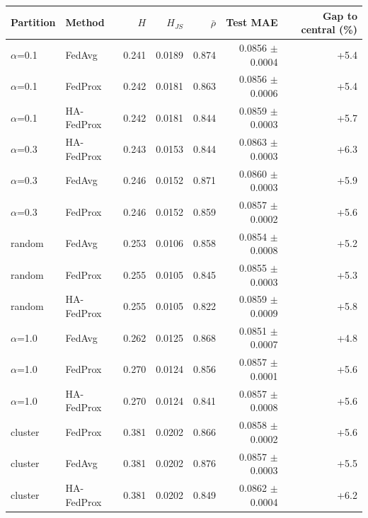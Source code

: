 \begin{tabular}{llrrrrr}
\toprule
Partition & Method & $H$ & $H_{JS}$ & $\bar\rho$ & Test MAE & Gap to central (\%) \\
\midrule
$\alpha$=0.1 & FedAvg & 0.241 & 0.0189 & 0.874 & 0.0856 $\pm$ 0.0004 & +5.4 \\
$\alpha$=0.1 & FedProx & 0.242 & 0.0181 & 0.863 & 0.0856 $\pm$ 0.0006 & +5.4 \\
$\alpha$=0.1 & HA-FedProx & 0.242 & 0.0181 & 0.844 & 0.0859 $\pm$ 0.0003 & +5.7 \\
$\alpha$=0.3 & HA-FedProx & 0.243 & 0.0153 & 0.844 & 0.0863 $\pm$ 0.0003 & +6.3 \\
$\alpha$=0.3 & FedAvg & 0.246 & 0.0152 & 0.871 & 0.0860 $\pm$ 0.0003 & +5.9 \\
$\alpha$=0.3 & FedProx & 0.246 & 0.0152 & 0.859 & 0.0857 $\pm$ 0.0002 & +5.6 \\
random & FedAvg & 0.253 & 0.0106 & 0.858 & 0.0854 $\pm$ 0.0008 & +5.2 \\
random & FedProx & 0.255 & 0.0105 & 0.845 & 0.0855 $\pm$ 0.0003 & +5.3 \\
random & HA-FedProx & 0.255 & 0.0105 & 0.822 & 0.0859 $\pm$ 0.0009 & +5.8 \\
$\alpha$=1.0 & FedAvg & 0.262 & 0.0125 & 0.868 & 0.0851 $\pm$ 0.0007 & +4.8 \\
$\alpha$=1.0 & FedProx & 0.270 & 0.0124 & 0.856 & 0.0857 $\pm$ 0.0001 & +5.6 \\
$\alpha$=1.0 & HA-FedProx & 0.270 & 0.0124 & 0.841 & 0.0857 $\pm$ 0.0008 & +5.6 \\
cluster & FedProx & 0.381 & 0.0202 & 0.866 & 0.0858 $\pm$ 0.0002 & +5.6 \\
cluster & FedAvg & 0.381 & 0.0202 & 0.876 & 0.0857 $\pm$ 0.0003 & +5.5 \\
cluster & HA-FedProx & 0.381 & 0.0202 & 0.849 & 0.0862 $\pm$ 0.0004 & +6.2 \\
\bottomrule
\end{tabular}
